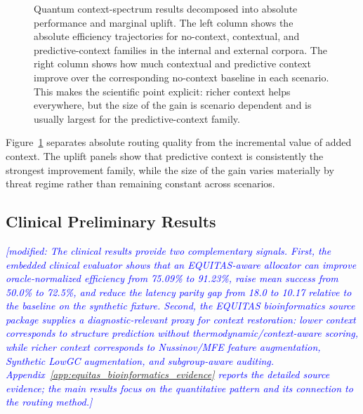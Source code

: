 \documentclass[conference]{IEEEtran}
\newcommand{\modified}[1]{\textcolor{blue}{{\it [modified: #1]}}}
\begin{document}
\begin{figure}[t]
\caption{Quantum context-spectrum results decomposed into absolute performance and marginal uplift. The left column shows the absolute efficiency trajectories for no-context, contextual, and predictive-context families in the internal and external corpora. The right column shows how much contextual and predictive context improve over the corresponding no-context baseline in each scenario. This makes the scientific point explicit: richer context helps everywhere, but the size of the gain is scenario dependent and is usually largest for the predictive-context family.}
\label{fig:context_spectrum}
\end{figure}

Figure~\ref{fig:context_spectrum} separates absolute routing quality from the incremental value of added context. The uplift panels show that predictive context is consistently the strongest improvement family, while the size of the gain varies materially by threat regime rather than remaining constant across scenarios.

\subsection{Clinical Preliminary Results}
\modified{The clinical results provide two complementary signals. First, the
embedded clinical evaluator shows that an EQUITAS-aware allocator can improve
oracle-normalized efficiency from 75.09\% to 91.23\%, raise mean success from
50.0\% to 72.5\%, and reduce the latency parity gap from 18.0 to 10.17 relative
to the baseline on the synthetic fixture. Second, the EQUITAS bioinformatics
source package supplies a diagnostic-relevant proxy for context restoration:
lower context corresponds to structure prediction without
thermodynamic/context-aware scoring, while richer context corresponds to
Nussinov/MFE feature augmentation, Synthetic LowGC augmentation, and
subgroup-aware auditing. Appendix~\ref{app:equitas_bioinformatics_evidence}
reports the detailed source evidence; the main results focus on the
quantitative pattern and its connection to the routing method.}
\end{document}
